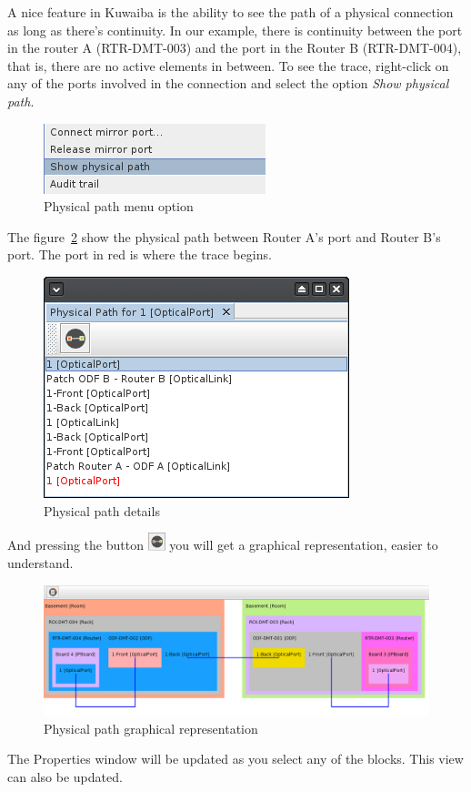 \documentclass[a4paper]{article}
\begin{document}
			A nice feature in Kuwaiba is the ability to see the path of a physical connection as long as there's continuity. In our example, there is continuity between the port in the router A (RTR-DMT-003) and the port in the Router B (RTR-DMT-004), that is, there are no active elements in between. To see the trace, right-click on any of the ports involved in the connection and select the option \textit{Show physical path}.
			\begin{figure}[h!]
				\centering
				\includegraphics[width=0.3\linewidth]{img/l1_example_2_physical_path_menu.png}
				\caption{Physical path menu option}
				\label{fig:l1_example_2_physical_path_menu}
			\end{figure}
			The figure~\ref{fig:l1_example_2_physical_path_list} show the physical path between Router A's port and Router B's port. The port in red is where the trace begins.
			\begin{figure}[h!]
				\centering
				\includegraphics[width=0.4\linewidth]{img/l1_example_2_physical_path_list.png}
				\caption{Physical path details}
				\label{fig:l1_example_2_physical_path_list}
			\end{figure}
			
			And pressing the button \includegraphics[width=0.5cm]{img/icon_physical_path_graphical.png} you will get a graphical representation, easier to understand.
			\begin{figure}[h!]
				\centering
				\includegraphics[width=1.1\linewidth]{img/l1_example_2_physical_path_view.png}
				\caption{Physical path graphical representation}
				\label{fig:l1_example_2_physical_path_view}
			\end{figure}
			The Properties window will be updated as you select any of the blocks. This view can also be updated.
	\newpage
\end{document}
